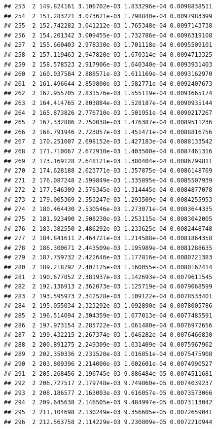 \documentclass[article]{jss}\usepackage[]{graphicx}\usepackage[]{xcolor}
\makeatletter
\newenvironment{kframe}{%
 \def\at@end@of@kframe{}%
 \ifinner\ifhmode%
  \def\at@end@of@kframe{\end{minipage}}%
  \begin{minipage}{\columnwidth}%
 \fi\fi%
 \def\FrameCommand##1{\hskip\@totalleftmargin \hskip-\fboxsep
 \colorbox{shadecolor}{##1}\hskip-\fboxsep
     \hskip-\linewidth \hskip-\@totalleftmargin \hskip\columnwidth}%
 \MakeFramed {\advance\hsize-\width
   \@totalleftmargin\z@ \linewidth\hsize
   \@setminipage}}%
 {\par\unskip\endMakeFramed%
 \at@end@of@kframe}
\newenvironment{knitrout}{}{} %
\makeatother
\begin{document}
\begin{knitrout}
\begin{kframe}
\begin{verbatim}
## 253  2 149.824161 3.106702e-03 1.833296e-04 0.0098838511
## 254  2 151.283221 3.073621e-03 1.798840e-04 0.0097983399
## 255  2 152.742282 3.041212e-03 1.765348e-04 0.0097143738
## 256  2 154.201342 3.009455e-03 1.732786e-04 0.0096319108
## 257  2 155.660403 2.978330e-03 1.701118e-04 0.0095509101
## 258  2 157.119463 2.947820e-03 1.670314e-04 0.0094713325
## 259  2 158.578523 2.917906e-03 1.640340e-04 0.0093931403
## 260  2 160.037584 2.888571e-03 1.611169e-04 0.0093162970
## 261  2 161.496644 2.859800e-03 1.582771e-04 0.0092407673
## 262  2 162.955705 2.831576e-03 1.555119e-04 0.0091665174
## 263  2 164.414765 2.803884e-03 1.528187e-04 0.0090935144
## 264  2 165.873826 2.776710e-03 1.501951e-04 0.0090217267
## 265  2 167.332886 2.750038e-03 1.476387e-04 0.0089511236
## 266  2 168.791946 2.723857e-03 1.451471e-04 0.0088816756
## 267  2 170.251007 2.698152e-03 1.427183e-04 0.0088133542
## 268  2 171.710067 2.672910e-03 1.403500e-04 0.0087461316
## 269  2 173.169128 2.648121e-03 1.380404e-04 0.0086799811
## 270  2 174.628188 2.623771e-03 1.357875e-04 0.0086148769
## 271  2 176.087248 2.599849e-03 1.335895e-04 0.0085507939
## 272  2 177.546309 2.576345e-03 1.314445e-04 0.0084877078
## 273  2 179.005369 2.553247e-03 1.293509e-04 0.0084255953
## 274  2 180.464430 2.530546e-03 1.273071e-04 0.0083644335
## 275  2 181.923490 2.508230e-03 1.253115e-04 0.0083042005
## 276  2 183.382550 2.486292e-03 1.233625e-04 0.0082448748
## 277  2 184.841611 2.464721e-03 1.214588e-04 0.0081864358
## 278  2 186.300671 2.443509e-03 1.195989e-04 0.0081288635
## 279  2 187.759732 2.422646e-03 1.177816e-04 0.0080721383
## 280  2 189.218792 2.402125e-03 1.160055e-04 0.0080162414
## 281  2 190.677852 2.381937e-03 1.142693e-04 0.0079611545
## 282  2 192.136913 2.362073e-03 1.125719e-04 0.0079068599
## 283  2 193.595973 2.342528e-03 1.109122e-04 0.0078533401
## 284  2 195.055034 2.323292e-03 1.092890e-04 0.0078005786
## 285  2 196.514094 2.304359e-03 1.077013e-04 0.0077485591
## 286  2 197.973154 2.285722e-03 1.061480e-04 0.0076972656
## 287  2 199.432215 2.267374e-03 1.046282e-04 0.0076466830
## 288  2 200.891275 2.249309e-03 1.031409e-04 0.0075967962
## 289  2 202.350336 2.231520e-03 1.016851e-04 0.0075475908
## 290  2 203.809396 2.214000e-03 1.002601e-04 0.0074990527
## 291  2 205.268456 2.196745e-03 9.886484e-05 0.0074511681
## 292  2 206.727517 2.179748e-03 9.749860e-05 0.0074039237
## 293  2 208.186577 2.163003e-03 9.616057e-05 0.0073573066
## 294  2 209.645638 2.146505e-03 9.484997e-05 0.0073113042
## 295  2 211.104698 2.130249e-03 9.356605e-05 0.0072659041
## 296  2 212.563758 2.114229e-03 9.230809e-05 0.0072210944

\end{verbatim}
\end{kframe}
\end{knitrout}
\end{document}
